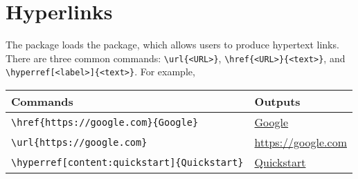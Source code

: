 \chapter{Hyperlinks}
\label{content:hyperlinks}

The \elsatoolbox{} package loads the  package, which allows users to produce hypertext links. There are three common commands: \verb|\url{<URL>}|, \verb|\href{<URL>}{<text>}|, and \verb|\hyperref[<label>]{<text>}|. For example,

\bigskip

\begin{tabular}{ll}
    \toprule
    Commands & Outputs \\
    \midrule
    \verb|\href{https://google.com}{Google}| & \href{https://google.com}{Google} \\
    \verb|\url{https://google.com}| & \url{https://google.com} \\
    \verb|\hyperref[content:quickstart]{Quickstart}| & \hyperref[content:quickstart]{Quickstart} \\
    \bottomrule
\end{tabular}
